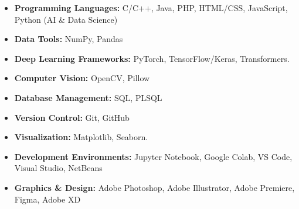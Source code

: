 \documentclass[a4paper,11pt]{article}
\begin{document}
\begin{itemize}[leftmargin=1.5em, topsep=2pt, itemsep=2pt]
  \item \textbf{Programming Languages:} C/C++, Java, PHP, HTML/CSS, JavaScript, Python (AI \& Data Science)
  \item \textbf{Data Tools:} NumPy, Pandas
  \item \textbf{Deep Learning Frameworks:} PyTorch, TensorFlow/Keras, Transformers.
  \item \textbf{Computer Vision:} OpenCV, Pillow
  \item \textbf{Database Management:} SQL, PLSQL
  \item \textbf{Version Control:} Git, GitHub
  \item \textbf{Visualization:} Matplotlib, Seaborn.
  \item \textbf{Development Environments:} Jupyter Notebook, Google Colab, VS Code, Visual Studio, NetBeans
  \item \textbf{Graphics \& Design:} Adobe Photoshop, Adobe Illustrator, Adobe Premiere, Figma, Adobe XD
\end{itemize}
\end{document}
